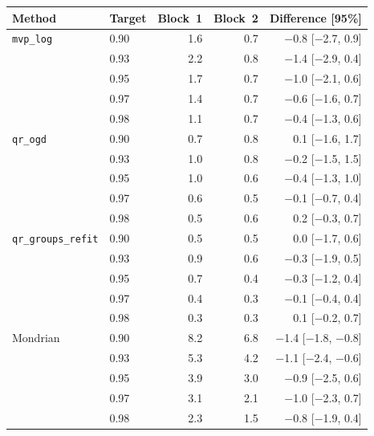 \setlength{\tabcolsep}{3.4pt}
\begin{tabular}{@{}llrrr@{}}
\toprule
Method & Target & Block~1 \Dbar{} & Block~2 \Dbar{} & Difference [95\%] \\
\midrule
\texttt{mvp\_log} & 0.90 & 1.6 & 0.7 & $-$0.8 [$-$2.7, 0.9] \\
 & 0.93 & 2.2 & 0.8 & $-$1.4 [$-$2.9, 0.4] \\
 & 0.95 & 1.7 & 0.7 & $-$1.0 [$-$2.1, 0.6] \\
 & 0.97 & 1.4 & 0.7 & $-$0.6 [$-$1.6, 0.7] \\
 & 0.98 & 1.1 & 0.7 & $-$0.4 [$-$1.3, 0.6] \\
\addlinespace
\texttt{qr\_ogd} & 0.90 & 0.7 & 0.8 & 0.1 [$-$1.6, 1.7] \\
 & 0.93 & 1.0 & 0.8 & $-$0.2 [$-$1.5, 1.5] \\
 & 0.95 & 1.0 & 0.6 & $-$0.4 [$-$1.3, 1.0] \\
 & 0.97 & 0.6 & 0.5 & $-$0.1 [$-$0.7, 0.4] \\
 & 0.98 & 0.5 & 0.6 & 0.2 [$-$0.3, 0.7] \\
\addlinespace
\texttt{qr\_groups\_refit} & 0.90 & 0.5 & 0.5 & 0.0 [$-$1.7, 0.6] \\
 & 0.93 & 0.9 & 0.6 & $-$0.3 [$-$1.9, 0.5] \\
 & 0.95 & 0.7 & 0.4 & $-$0.3 [$-$1.2, 0.4] \\
 & 0.97 & 0.4 & 0.3 & $-$0.1 [$-$0.4, 0.4] \\
 & 0.98 & 0.3 & 0.3 & 0.1 [$-$0.2, 0.7] \\
\addlinespace
Mondrian & 0.90 & 8.2 & 6.8 & $-$1.4 [$-$1.8, $-$0.8] \\
 & 0.93 & 5.3 & 4.2 & $-$1.1 [$-$2.4, $-$0.6] \\
 & 0.95 & 3.9 & 3.0 & $-$0.9 [$-$2.5, 0.6] \\
 & 0.97 & 3.1 & 2.1 & $-$1.0 [$-$2.3, 0.7] \\
 & 0.98 & 2.3 & 1.5 & $-$0.8 [$-$1.9, 0.4] \\
\bottomrule
\end{tabular}
